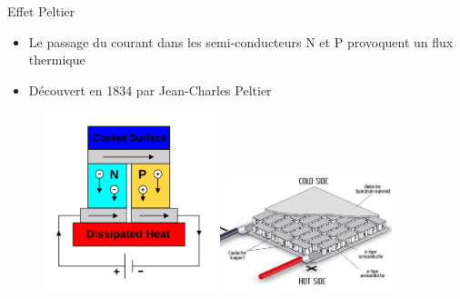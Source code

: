 \documentclass[compress, noflama]{beamer}
\begin{document}
{
\begin{frame}{Effet Peltier}
\begin{itemize}
\item Le passage du courant dans les semi-conducteurs N et P provoquent un flux thermique
\item Découvert en 1834 par Jean-Charles Peltier
\end{itemize}
\begin{figure}
\centering
\includegraphics[width=5cm]{images/peltierEffect}
\includegraphics[width=5cm]{images/schematic-diagram-of-peltier-module}
\end{figure}
\end{frame}
}
\end{document}
